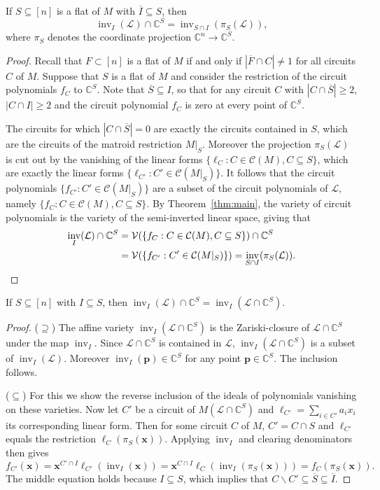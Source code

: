 \documentclass[ALCO,ThmDefs,Unicode,epreuves]{cedram}
\newcommand{\Cbb}{\mathbb{C}}
\newcommand{\V}{\mathcal{V}}
\newcommand{\cL}{\mathcal{L}}
\newcommand{\CC}{\mathcal{C}}
\newcommand{\x}{\mathbf{x}}
\newcommand{\p}{\mathbf{p}}
\newcommand{\ol}{\overline}
\DeclareMathOperator{\inv}{inv}
\begin{document}
\begin{lemm} \label{lem:pi}
If $S\subseteq [n]$ is a flat of $M$ with $\ol{I} \subseteq S$, then 
\[
\inv_I(\cL)\cap \Cbb^S  =  \inv_{S\cap I}\left(\pi_{S}(\cL)\right),
\] 
where $\pi_S$ denotes the coordinate projection $\Cbb^n \rightarrow \Cbb^S$. 
\end{lemm}
\begin{proof}
Recall that $F\subset [n]$ is a flat of $M$ if and only if $|\ol{F}\cap C|\neq 1$ for all 
circuits $C$ of $M$. Suppose that $S$ is a flat of $M$ and consider 
 the restriction of the circuit polynomials $f_C$ to $\Cbb^S$. 
Note that $\ol{S} \subseteq I$, so that for any circuit $C$ with $|C\cap \ol{S}| \geq 2$, 
 $|C\cap I|\geq 2$ and the circuit polynomial $f_C$ is zero at every point of $\Cbb^S$. 
 
 The circuits for which $|C\cap \ol{S}|= 0$ are exactly the circuits contained in $S$, 
 which are the circuits of the matroid restriction $M|_S$. Moreover the projection 
 $\pi_S(\cL)$ is cut out by the vanishing of the linear forms 
 $\{\ell_C: C\in \CC (M), C\subseteq S\}$, which are exactly the linear forms 
 $\{\ell_{C'} : C'\in \CC (M|_S)\}$. 
 It follows that the circuit polynomials ${\{f_{C'} : C'\in \CC (M|_S)\}}$
 are a subset of the circuit polynomials of $\cL$, namely 
 ${\{f_C: C\in \CC (M), C\subseteq S\}}$. By Theorem~\ref{thm:main}, the variety of 
 circuit polynomials is the variety of the semi-inverted linear space, giving that 
 \begin{align*}
 \inv_I(\cL)\cap\Cbb^S & = \V(\{f_C: C\in \CC (M), C\subseteq S\})\cap{\Cbb^S} \\
 & = \V(\{f_{C'} : C'\in \CC (M|_S)\}) = \inv_{S\cap I}(\pi_S(\cL)). \qedhere
 \end{align*}
\end{proof}


\begin{lemm} \label{lem:cap}
If $S\subseteq [n]$ with $I \subseteq S $, then 
$\inv_I(\cL) \cap \Cbb^S =\inv_{I}\left(\cL \cap \Cbb^S\right)$. 
\end{lemm}
\begin{proof} 
($\supseteq$) The affine variety $\inv_{I}\left(\cL \cap \Cbb^S\right)$ is the Zariski-closure of 
$\cL \cap \Cbb^S$ under the map $\inv_I$. Since $\cL \cap \Cbb^S$ is contained in $\cL$, 
$\inv_{I}\left(\cL \cap \Cbb^S\right)$ is a subset of $\inv_I(\cL)$. Moreover $\inv_I(\p) \in \Cbb^S$ 
for any point $\p\in \Cbb^S$. The inclusion follows. 

($\subseteq$) For this we show the reverse inclusion of the ideals of polynomials vanishing on these varieties. 
Now let $C'$ be a circuit of $M(\cL\cap \Cbb^S)$ and 
$\ell_{C'} = \sum_{i\in C'}a_ix_i$ its corresponding linear form. 
Then for some circuit $C$ of $M$, 
$C' = C\cap S$ and $\ell_{C'} $ equals the restriction $\ell_C(\pi_S(\x))$. 
Applying $\inv_I$ and clearing denominators then gives 
\[
f_{C'}(\x) 
 =  \x^{C'\cap I} \ell_{C'}(\inv_I(\x))
 =  \x^{C\cap I} \ell_{C}(\inv_I(\pi_S(\x)))  =  f_C(\pi_S(\x)).
\]
The middle equation holds because $I \subseteq S$, which implies that $C\backslash C' \subseteq \ol{S} \subseteq \ol{I}$.
\end{proof}
\end{document}

